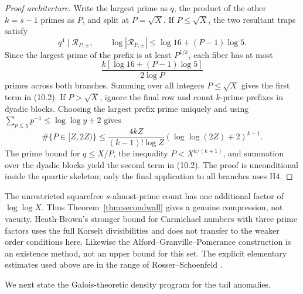 \documentclass[11pt]{amsart}
\theoremstyle{definition}
\theoremstyle{remark}
\begin{document}
\begin{proof}[Proof architecture]
Write the largest prime as \(q\), the product of the other
\(k=s-1\) primes as \(P\), and split at \(P=\sqrt X\). If
\(P\le\sqrt X\), the two resultant traps satisfy
\[
q^4\mid\mathcal R_{P,\pm},\qquad
\log|\mathcal R_{P,\pm}|\le\log16+(P-1)\log5.
\]
Since the largest prime of the prefix is at least \(P^{1/k}\), each
fiber has at most
\[
\frac{k[\log16+(P-1)\log5]}{2\log P}
\]
primes across both branches. Summing over all integers \(P\le\sqrt X\)
gives the first term in (10.2). If \(P>\sqrt X\), ignore the final row
and count \(k\)-prime prefixes in dyadic blocks. Choosing the largest
prefix prime uniquely and using
\(\sum_{p\le y}p^{-1}\le\log\log y+2\) gives
\[
\#\{P\in[Z,2Z)\}
\le\frac{4kZ}{(k-1)!\log Z}
(\log\log(2Z)+2)^{k-1}.
\]
The prime bound for \(q\le X/P\), the inequality
\(P<X^{k/(k+1)}\), and summation over the dyadic blocks yield the second
term in (10.2). The proof is unconditional inside the quartic skeleton;
only the final application to all branches uses H4.
\end{proof}

The unrestricted squarefree \(s\)-almost-prime count has one additional
factor of \(\log\log X\). Thus Theorem~\ref{thm:secondwall} gives a genuine
compression, not vacuity. Heath-Brown's stronger bound for Carmichael
numbers with three prime factors \cite{HB2007} uses the full Korselt
divisibilities and does not transfer to the weaker order conditions here.
Likewise the Alford--Granville--Pomerance construction \cite{AGP1994} is
an existence method, not an upper bound for this set. The explicit
elementary estimates used above are in the range of
Rosser--Schoenfeld \cite{RS1962}.

We next state the Galois-theoretic density program for the tail anomalies.
\end{document}
